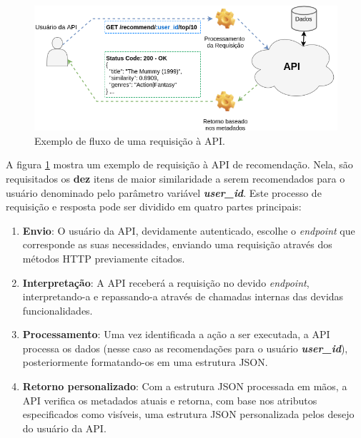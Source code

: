 \documentclass[12pt, openright, oneside, a4paper, brazil]{abntex2}
\begin{document}
\begin{figure}[htp]
	\caption{\label{interconnection}Exemplo de fluxo de uma requisição à API.}
	\begin{center}
		\includegraphics[scale=0.62]{images/interconnection.png}
	\end{center}
	\hspace{5.5cm}{Fonte: O Autor.}
\end{figure}

A figura \ref{interconnection} mostra um exemplo de requisição à API de recomendação. Nela, são requisitados os \textbf{dez} itens de maior similaridade a serem recomendados para o usuário denominado pelo parâmetro variável \textbf{\textit{user\_id}}. Este processo de requisição e resposta pode ser dividido em quatro partes principais:

\begin{enumerate}
	\item \textbf{Envio}: O usuário da API, devidamente autenticado, escolhe o \textit{endpoint} que corresponde as suas necessidades, enviando uma requisição através dos métodos HTTP previamente citados.

	\item \textbf{Interpretação}: A API receberá a requisição no devido \textit{endpoint}, interpretando-a e repassando-a através de chamadas internas das devidas funcionalidades.

	\item \textbf{Processamento}: Uma vez identificada a ação a ser executada, a API processa os dados (nesse caso as recomendações para o usuário \textbf{\textit{user\_id}}), posteriormente formatando-os em uma estrutura JSON.

	\item \textbf{Retorno personalizado}: Com a estrutura JSON processada em mãos, a API verifica os metadados atuais e retorna, com base nos atributos especificados como visíveis, uma estrutura JSON personalizada pelos desejo do usuário da API.
\end{enumerate}
\end{document}
